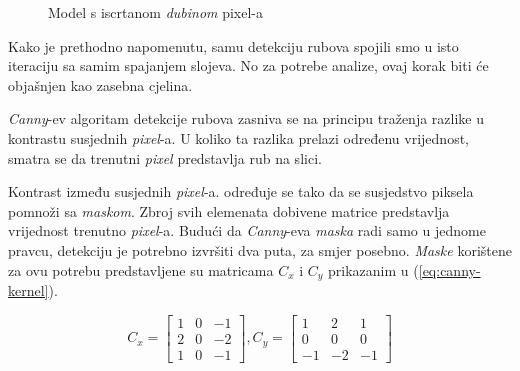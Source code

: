 \begin{figure}[H]
\centering{}
\caption{Model s iscrtanom \emph{dubinom} pixel-a}
\label{fig:monkey-depth}
\end{figure}

Kako je prethodno napomenutu, samu detekciju rubova spojili smo u isto iteraciju sa samim spajanjem slojeva. No za potrebe analize, ovaj korak biti će objašnjen kao zasebna cjelina.

\emph{Canny}-ev algoritam detekcije rubova zasniva se na principu traženja razlike u kontrastu susjednih \emph{pixel}-a. U koliko ta razlika prelazi određenu vrijednost, smatra se da trenutni \emph{pixel} predstavlja rub na slici.

Kontrast između susjednih \emph{pixel}-a. određuje se tako da se susjedstvo piksela pomnoži sa \emph{maskom}. Zbroj svih elemenata dobivene matrice predstavlja vrijednost trenutno \emph{pixel}-a. Budući da \emph{Canny}-eva \emph{maska} radi samo u jednome pravcu, detekciju je potrebno izvršiti dva puta, za smjer posebno. \emph{Maske} korištene za ovu potrebu predstavljene su matricama $C_x$ i $C_y$ prikazanim u (\ref{eq:canny-kernel}).

\begin{equation}
\label{eq:canny-kernel}
	C_x = 
	\begin{bmatrix}
		1 & 0 & -1\\
		2 & 0 & -2\\
		1 & 0 & -1
	\end{bmatrix},
	C_y = 
	\begin{bmatrix}
		1 & 2 & 1\\
		0 & 0 & 0\\
		-1 & -2 & -1
	\end{bmatrix}
\end{equation}

